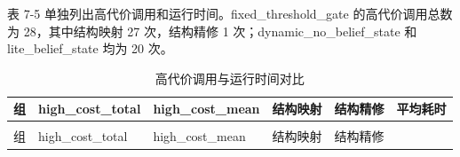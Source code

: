 表 7-5 单独列出高代价调用和运行时间。fixed\_threshold\_gate
的高代价调用总数为 28，其中结构映射 27 次，结构精修 1
次；dynamic\_no\_belief\_state 和 lite\_belief\_state 均为 20 次。

{%
\begin{longtable}{@{}
  >{\centering\arraybackslash}p{}
  >{\centering\arraybackslash}p{}
  >{\centering\arraybackslash}p{}
  >{\centering\arraybackslash}p{}
  >{\centering\arraybackslash}p{}
  >{\centering\arraybackslash}p{}@{}}
\caption{高代价调用与运行时间对比}\label{tab:7-5}\\
\toprule
\begin{minipage}[b]{\linewidth}\centering
组
\end{minipage} & \begin{minipage}[b]{\linewidth}\centering
high\_cost\_total
\end{minipage} & \begin{minipage}[b]{\linewidth}\centering
high\_cost\_mean
\end{minipage} & \begin{minipage}[b]{\linewidth}\centering
结构映射
\end{minipage} & \begin{minipage}[b]{\linewidth}\centering
结构精修
\end{minipage} & \begin{minipage}[b]{\linewidth}\centering
平均耗时
\end{minipage} \\
\midrule
\endfirsthead
\multicolumn{6}{r}{表\thetable（续表）} \\
\toprule
\begin{minipage}[b]{\linewidth}\centering
组
\end{minipage} & \begin{minipage}[b]{\linewidth}\centering
high\_cost\_total
\end{minipage} & \begin{minipage}[b]{\linewidth}\centering
high\_cost\_mean
\end{minipage} & \begin{minipage}[b]{\linewidth}\centering
结构映射
\end{minipage} & \begin{minipage}[b]{\linewidth}\centering
结构精修

\end{minipage}
\end{longtable}}
